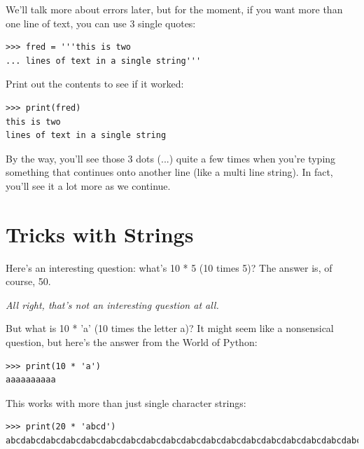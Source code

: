 We'll talk more about errors later, but for the moment, if you want more than one line of text, you can use 3 single quotes:

\begin{listing}
\begin{verbatim}
>>> fred = '''this is two
... lines of text in a single string'''
\end{verbatim}
\end{listing}

\noindent
Print out the contents to see if it worked:

\begin{listing}
\begin{verbatim}
>>> print(fred)
this is two
lines of text in a single string
\end{verbatim}
\end{listing}

By the way, you'll see those 3 dots (...) quite a few times when you're typing something that continues onto another line (like a multi line string).  In fact, you'll see it a lot more as we continue.

\section{Tricks with Strings}\label{trickswithstrings}

Here's an interesting question:  what's 10 * 5 (10 times 5)?  The answer is, of course, 50.

\noindent
\emph{All right, that's not an interesting question at all.}

But what is 10 * 'a' (10 times the letter a)?  It might seem like a nonsensical question, but here's the answer from the World of Python:

\begin{listing}
\begin{verbatim}
>>> print(10 * 'a')
aaaaaaaaaa
\end{verbatim}
\end{listing}

This works with more than just single character strings:

\begin{listing}
\begin{verbatim}
>>> print(20 * 'abcd')
abcdabcdabcdabcdabcdabcdabcdabcdabcdabcdabcdabcdabcdabcdabcdabcdabcdabcdabcdabcd
\end{verbatim}
\end{listing}

